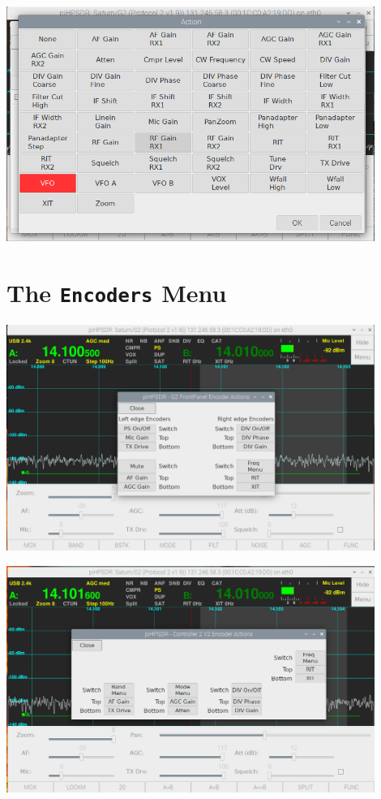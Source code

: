 \documentclass[12pt]{book}
\begin{document}
\begin{center}
\includegraphics[width=12cm]{MIDImenu3.png}
\end{center}
 
\section{The \texttt{Encoders} Menu}
\begin{center}
\includegraphics[width=12cm]{EncoderMenuG2.png}
\end{center}

\begin{center}
\includegraphics[width=12cm]{EncoderMenuV2.png}
\end{center}
\end{document}

